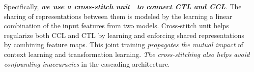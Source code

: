 Specifically, {\bf {\em we use a cross-stitch unit~\cite{misra2016cross} to
  connect CTL and CCL}}. The sharing of representations between them is
modeled by the learning a linear combination of the input features
from two models. Cross-stitch unit helps regularize both CCL and CTL
by learning and enforcing shared representations by combining feature
maps. This joint training {\em propagates the mutual impact} of context
learning and transformation learning. {\em The cross-stitching also helps
avoid confounding inaccuracies} in the cascading architecture.

